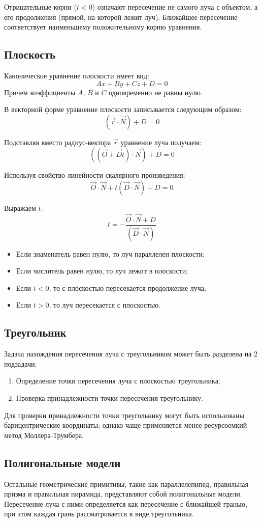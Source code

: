 Отрицательные корни ($t < 0$) означают пересечение не самого луча с объектом, а его продолжения (прямой, на которой лежит луч). Ближайшее пересечение соответствует наименьшему положительному корню уравнения.

\subsection{Плоскость}
Каноническое уравнение плоскости имеет вид:
\[
	Ax + By + Cz + D = 0
\]
Причем коэффициенты $A$, $B$ и $C$ одновременно не равны нулю.

В векторной форме уравнение плоскости записывается следующим образом:
\[
	(\vec{r} \cdot \vec{N}) + D = 0
\]

Подставляя вместо радиус-вектора $\vec{r}$ уравнение луча получаем:
\[
	((\vec{O} + \vec{D} t) \cdot \vec{N}) + D = 0
\]

Используя свойство линейности скалярного произведения:
\[
	\vec{O} \cdot \vec{N} + t (\vec{D} \cdot \vec{N}) + D = 0
\]

Выражаем $t$:
\[
	t = -\frac{\vec{O} \cdot \vec{N} + D}{(\vec{D} \cdot \vec{N})}
\]

\begin{itemize}
	\item Если знаменатель равен нулю, то луч параллелен плоскости;
	\item Если числитель равен нулю, то луч лежит в плоскости;
	\item Если $t < 0$, то с плоскостью пересекается продолжение луча;
	\item Если $t > 0$, то луч пересекается с плоскостью.
\end{itemize}

\subsection{Треугольник}
Задача нахождения пересечения луча с треугольником может быть разделена на 2 подзадачи:
\begin{enumerate}
	\item Определение точки пересечения луча с плоскостью треугольника;
	\item Проверка принадлежности точки пересечения треугольнику.
\end{enumerate}

Для проверки принадлежности точки треугольнику могут быть использованы барицентрические координаты; однако чаще применяется менее ресурсоемкий метод Моллера-Трумбера\cite{moller_trumbore1997}.

\subsection{Полигональные модели}
Остальные геометрические примитивы, такие как параллелепипед, правильная призма и правильная пирамида, представляют собой полигональные модели. Пересечение луча с ними определяется как пересечение с ближайшей гранью, при этом каждая грань рассматривается в виде треугольника.